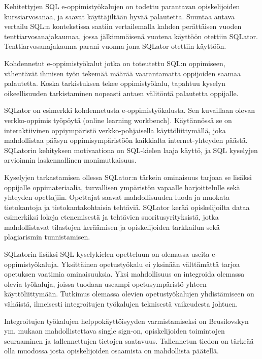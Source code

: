 \documentclass[finnish,twoside,openright]{HYgraduMLDS}
\begin{document}
Kehitettyjen SQL e-oppimistyökalujen on todettu parantavan opiskelijoiden kurssiarvosanaa, ja saavat käyttäjiltään hyvää palautetta\cite{Brusilovsky:2010:LSP:1656255.1656257}. Suuntaa antava vertailu SQL:n kontekstissa saatiin vertailemalla kahden perättäisen vuoden tenttiarvosanajakaumaa, jossa jälkimmäisenä vuotena käyttöön otettiin SQLator\cite{sadiq2004sqlator}. Tenttiarvosanajakauma parani vuonna jona SQLator otettiin käyttöön.

Kohdennetut e-oppimistyökalut jotka on toteutettu SQL:n oppimiseen, vähentävät ihmisen työn tekemää määrää vaarantamatta oppijoiden saamaa palautetta. Koska tarkistuksen tekee oppimistyökalu, tapahtuu kyselyn oikeellisuuden tarkistaminen nopeasti antaen välitöntä palautetta oppijalle. 

SQLator on esimerkki kohdennetusta e-oppimistyökalusta\cite{sadiq2004sqlator}. Sen kuvaillaan olevan verkko-oppimis työpöytä (online learning workbench). Käytännössä se on interaktiivinen oppiympäristö verkko-pohjaisella käyttöliittymällä, joka mahdollistaa pääsyn oppimisympäristöön kaikkialta internet-yhteyden päästä. SQLatorin kehityksen motivaationa on SQL-kielen laaja käyttö, ja SQL kyselyjen arvioinnin laskennallinen monimutkaisuus. 

Kyselyjen tarkastamisen ollessa SQLator:n tärkein ominaisuus tarjoaa se lisäksi oppijalle oppimateriaalia, turvallisen ympäristön vapaalle harjoittelulle sekä yhteyden opettajiin. Opettajat saavat mahdollisuuden luoda ja muokata tietokantoja ja tietokantakohtaisia tehtäviä. SQLator kerää opiskelijoilta dataa esimerkiksi lokeja etenemisestä ja tehtävien suoritusyrityksistä, jotka mahdollistavat tilastojen keräämisen ja opiskelijoiden tarkkailun sekä plagiarismin tunnistamisen.

SQLatorin lisäksi SQL-kyselykielen opetteluun on olemassa useita e-oppimistyökaluja. Yksittäinen opetustyökalu ei yksinään välttämättä tarjoa opetuksen vaatimia ominaisuuksia. Yksi mahdollisuus on integroida olemassa olevia työkaluja, joissa tuodaan useampi opetusympäristö yhteen käyttöliittymään. Tutkimus olemassa olevien opetustyökalujen yhdistämiseen on vähäistä, ilmeisesti integroitujen työkalujen teknisestä vaikeudesta johtuen\cite{Brusilovsky:2010:LSP:1656255.1656257}.

Integroitujen työkalujen helppokäyttöisyyden varmistamiseksi on Brusilovskyn ym. \cite{Brusilovsky:2010:LSP:1656255.1656257} mukaan mahdollistettava single sign-on, opiskelijoiden toimintojen seuraaminen ja tallennettujen tietojen saatavuus. Tallennetun tiedon on tärkeää olla muodossa josta opiskelijoiden osaamista on mahdollista päätellä.
\end{document}
